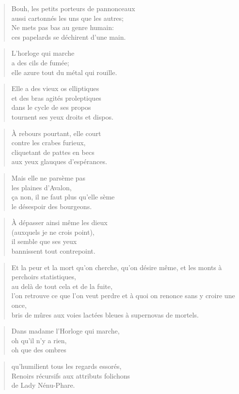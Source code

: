   \begin{verse}
    Bouh, les petits porteurs de pannonceaux\\
    aussi cartonnés les uns que les autres;\\
    Ne mets pas bas au genre humain:\\
    ces papelards se déchirent d’une main.
  \end{verse}
  \begin{verse}
    L’horloge qui marche\\
    a des cils de fumée;\\
    elle azure tout du métal qui rouille.
  \end{verse}
  \begin{verse}
    Elle a des vieux os elliptiques\\
    et des bras agités proleptiques\\
    dans le cycle de ses propos\\
    tournent ses yeux droits et dispos.
  \end{verse}
  \begin{verse}
    À rebours pourtant, elle court\\
    contre les crabes furieux,\\
    cliquetant de pattes en becs\\
    aux yeux glauques d’espérances.
  \end{verse}
  \begin{verse}
    Mais elle ne parsème pas\\
    les plaines d’Avalon,\\
    ça non, il ne faut plus qu’elle sème\\
    le désespoir des bourgeons.
  \end{verse}
  \begin{verse}
    À dépasser ainsi même les dieux\\
    (auxquels je ne crois point),\\
    il semble que ses yeux\\
    bannissent tout contrepoint.
  \end{verse}
  \begin{verse}
    Et la peur et la mort qu’on cherche, qu’on désire même, et les
    monts à perchoirs statistiques,\\
    au delà de tout cela et de la fuite,\\
    l’on retrouve ce que l’on veut perdre et à quoi on renonce
    sans y croire une once,\\
    bris de mûres aux voies lactées bleues à supernovas de
    mortels.
  \end{verse}
  \begin{verse}
    Dans madame l’Horloge qui marche,\\
    oh qu’il n’y a rien,\\
    oh que des ombres
  \end{verse}
  \begin{verse}
    qu’humilient tous les regards essorés,\\
    Renoirs récursifs aux attributs folichons\\
    de Lady Nénu-Phare.
  \end{verse}
